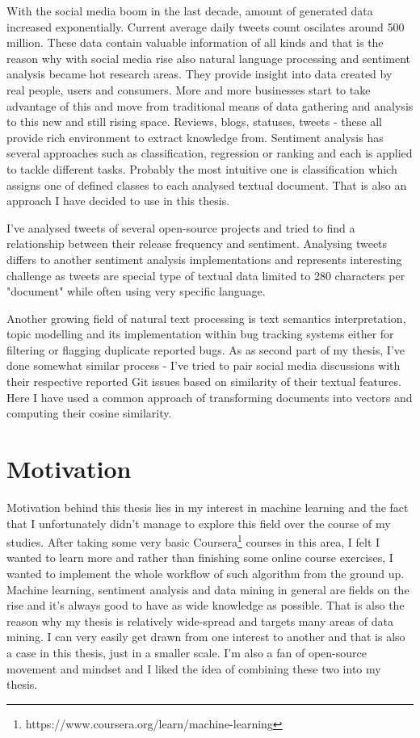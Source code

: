 With the social media boom in the last decade, amount of generated data increased exponentially. Current average daily tweets count oscilates around 500 million. These data contain valuable information of all kinds and that is the reason why with social media rise also natural language processing and sentiment analysis became hot research areas. They provide insight into data created by real people, users and consumers. More and more businesses start to take advantage of this and move from traditional means of data gathering and analysis to this new and still rising space. Reviews, blogs, statuses, tweets - these all provide rich environment to extract knowledge from.
Sentiment analysis has several approaches such as classification, regression or ranking and each is applied to tackle different tasks. Probably the most intuitive one is classification which assigns one of defined classes to each analysed textual document. That is also an approach I have decided to use in this thesis. 

I've analysed tweets of several open-source projects and tried to find a relationship between their release frequency and sentiment. Analysing tweets differs to another sentiment analysis implementations and represents interesting challenge as tweets are special type of textual data limited to 280 characters per "document" while often using very specific language.

Another growing field of natural text processing is text semantics interpretation, topic modelling and its implementation within bug tracking systems either for filtering or flagging duplicate reported bugs. As as second part of my thesis, I've done somewhat similar process - I've tried to pair social media discussions with their respective reported Git issues based on similarity of their textual features. Here I have used a common approach of transforming documents into vectors and computing their cosine similarity.

\section{Motivation}
Motivation behind this thesis lies in my interest in machine learning and the fact that I unfortunately didn't manage to explore this field over the course of my studies. After taking some very basic Coursera\footnote{https://www.coursera.org/learn/machine-learning} courses in this area, I felt I wanted to learn more and rather than finishing some online course exercises, I wanted to implement the whole workflow of such algorithm from the ground up. Machine learning, sentiment analysis and data mining in general are fields on the rise and it's always good to have as wide knowledge as possible. That is also the reason why my thesis is relatively wide-spread and targets many areas of data mining. I can very easily get drawn from one interest to another and that is also a case in this thesis, just in a smaller scale. I'm also a fan of open-source movement and mindset and I liked the idea of combining these two into my thesis.